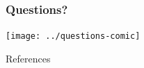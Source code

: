 \documentclass[handout]{beamer}
\renewcommand{\(}{\begin{columns}}
\renewcommand{\)}{\end{columns}}
\newcommand{\<}[1]{\begin{column}{#1}}
\renewcommand{\>}{\end{column}}
\begin{document}


\section*{}
\begin{frame}[fragile]
  \frametitle{Questions?}
  \begin{center}
  \texttt{[image: ../questions-comic]}  
  \end{center}
  
\end{frame}

\begin{frame}[allowframebreaks]{References}
	
	
\end{frame}
\end{document}

